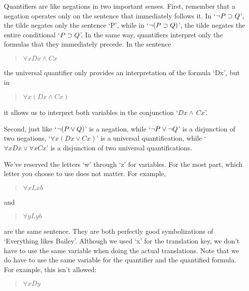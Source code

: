 \documentclass[../logic-text.tex]{subfiles}
\begin{document}
Quantifiers are like negations in two important senses.
First, remember that a negation operates only on the sentence that immediately follows it.
In \enquote*{\(\neg P \supset Q\)}, the tilde negates only the sentence \enquote*{P}, while in \enquote*{\(\neg (P \supset Q)\)}, the tilde negates the entire conditional \enquote*{\(P \supset Q\)}.
In the same way, quantifiers interpret only the formulas that they immediately precede.
In the sentence

\begin{quote}
  \(\forall  xDx  \land  Cx \)
\end{quote}

\noindent the universal quantifier only provides an interpretation of the formula \enquote*{Dx}, but in

\begin{quote}
  \(\forall  x(Dx  \land  Cx )\)
\end{quote}

\noindent it allows us to interpret both variables in the conjunction \enquote*{\(Dx  \land\,  Cx \)}.

Second, just like \enquote*{\(\neg (P \lor Q) \)} is a negation, while \enquote*{\(\neg P \lor \neg Q\)} is a disjunction of two negations, \enquote*{\(\forall  x(Dx  \lor  Cx)\)} is a universal quantification, while  \enquote*{\(\forall  xDx  \lor \forall  xCx \)} is a disjunction of two universal quantifications.


We've reserved the letters \enquote*{w} through \enquote*{z} for variables.
For the most part, which letter you choose to use does not matter.
For example,

\begin{quote}
  \(\forall xLxb\)
\end{quote}

\noindent and

\begin{quote}
  \(\forall yLyb\)
\end{quote}

are the same sentence.
They are both perfectly good symbolizations  of  \enquote*{Everything likes Bailey}.
Although we used \enquote*{x} for the translation key, we don't have to use the same variable when doing the actual translations.
Note that we do have to use the same variable for the quantifier and the quantified formula.
For example, this isn't allowed:

\begin{quote}
  \(\forall xDy\)
\end{quote}
\end{document}
